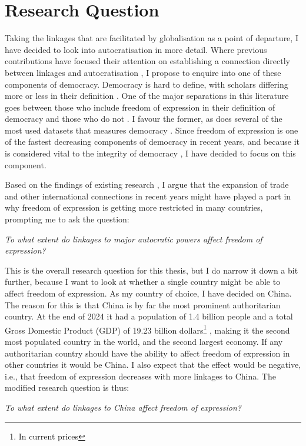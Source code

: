 \section{Research Question}
Taking the linkages that are facilitated by globalisation as a point of departure, I have decided to look into autocratisation in more detail. Where previous contributions have focused their attention on establishing a connection directly between linkages and autocratisation \cite{bader_china_2015}, I propose to enquire into one of these components of democracy. Democracy is hard to define, with scholars differing more or less in their definition \citep{dahl_polyarchy_1971, dahl_democracy_1989, przeworski_democracy_1991, schumpeter_capitalism_2010}. One of the major separations in this literature goes between those who include freedom of expression in their definition of democracy \citep{dahl_polyarchy_1971} and those who do not \citep{przeworski_democracy_1991, schumpeter_capitalism_2010}. I favour the former, as does several of the most used datasets that measures democracy \citep{economist_intelligence_unit_democracy_2024, freedom_house_freedom_2024, marshall_polity5_2020, coppedge_v-dem_2024-1}. Since freedom of expression is one of the fastest decreasing components of democracy in recent years\citep{nord_democracy_2025}, and because it is considered vital to the integrity of democracy \citep{dahl_polyarchy_1971}, I have decided to focus on this component.  

Based on the findings of existing research \citep{ambrosio_constructing_2010, gamso_is_2021, levitsky_linkage_2006, luhrmann_third_2019}, I argue that the expansion of trade and other international connections in recent years might have played a part in why freedom of expression is getting more restricted in many countries, prompting me to ask the question:
\begin{displayquote}
    \textit{To what extent do linkages to major autocratic powers affect freedom of expression?}
    \label{rq:general}
\end{displayquote}
This is the overall research question for this thesis, but I do narrow it down a bit further, because I want to look at whether a single country might be able to affect freedom of expression. As my country of choice, I have decided on China. The reason for this is that China is by far the most prominent authoritarian country. At the end of 2024 it had a population of 1.4 billion people \citep{guojia_tongjiju_national_bureau_of_statistics_zong_2024} and a total Gross Domestic Product (GDP) of 19.23 billion dollars\footnote{In current prices} \citep{imf_world_2025}, making it the second most populated country in the world, and the second largest economy. If any authoritarian country should have the ability to affect freedom of expression in other countries it would be China. I also expect that the effect would be negative, i.e., that freedom of expression decreases with more linkages to China. The modified research question is thus:
\begin{displayquote}
    \textit{To what extent do linkages to China affect freedom of expression?}
    \label{rq:specific}
\end{displayquote}

